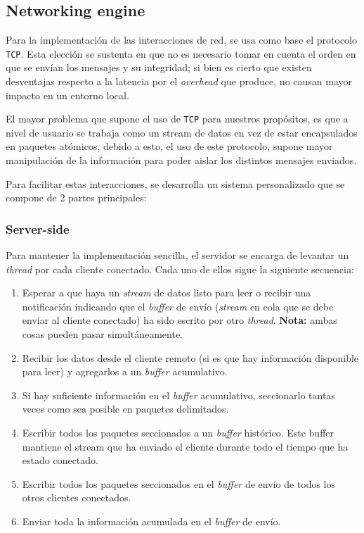 

\subsection{Networking engine}
Para la implementación de las interacciones de red, se usa como base el protocolo \texttt{TCP}. Esta elección se sustenta en que no es necesario tomar en cuenta el orden en que se envían los mensajes y su integridad; si bien es cierto que existen desventajas respecto a la latencia por el \emph{overhead} que produce, no causan mayor impacto en un entorno local.

El mayor problema que supone el uso de \texttt{TCP} para nuestros propósitos, es que a nivel de usuario se trabaja como un stream de datos en vez de estar encapsulados en paquetes atómicos, debido a esto, el uso de este protocolo, supone mayor manipulación de la información para poder aislar los distintos mensajes enviados.

Para facilitar estas interacciones, se desarrolla un sistema personalizado que se compone de 2 partes principales:

\subsubsection*{Server-side}
Para mantener la implementación sencilla, el servidor se encarga de levantar un \emph{thread} por cada cliente conectado. Cada uno de ellos sigue la siguiente secuencia:

\begin{enumerate}
	\item Esperar a que haya un \emph{stream} de datos listo para leer o recibir una notificación indicando que el \emph{buffer} de envío (\emph{stream} en cola que se debe enviar al cliente conectado) ha sido escrito por otro \emph{thread}. \textbf{Nota:} ambas cosas pueden pasar simultáneamente.
	\item Recibir los datos desde el cliente remoto (si es que hay información disponible para leer) y agregarlos a un \emph{buffer} acumulativo.
	\item Si hay suficiente información en el \emph{buffer} acumulativo, seccionarlo tantas veces como sea posible en paquetes delimitados.
	\item Escribir todos los paquetes seccionados a un \emph{buffer} histórico. Este buffer mantiene el stream que ha enviado el cliente durante todo el tiempo que ha estado conectado.
	\item Escribir todos los paquetes seccionados en el \emph{buffer} de envío de todos los otros clientes conectados.
	\item Enviar toda la información acumulada en el \emph{buffer} de envío.
\end{enumerate}


